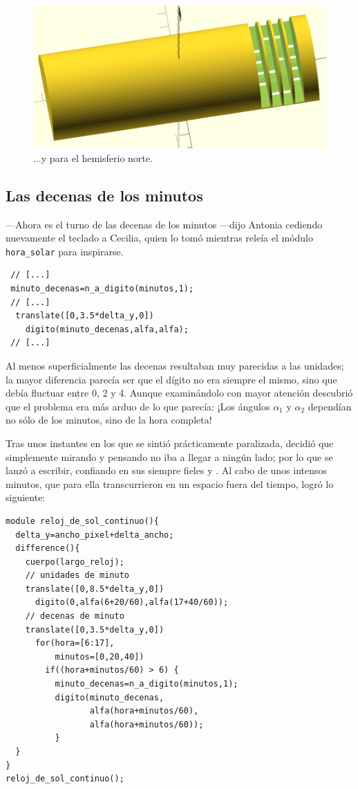 \begin{figure}[ht]
  \centering
  \includegraphics[width=.85\textwidth]{imagenes/unidades-minutos}  
  \caption{...y para el hemisferio norte.}
  \label{fig:unidades-norte}
\end{figure}

\subsection{Las decenas de los minutos}

---Ahora es el turno de las decenas de los minutos ---dijo Antonia
cediendo nuevamente el teclado a Cecilia, quien lo tomó mientras
releía el módulo \lstinline!hora_solar! para inspirarse.

\begin{lstlisting}
 // [...]
 minuto_decenas=n_a_digito(minutos,1);
 // [...]
  translate([0,3.5*delta_y,0])
    digito(minuto_decenas,alfa,alfa);
 // [...]
\end{lstlisting}

Al menos superficialmente las decenas resultaban muy parecidas a las
unidades; la mayor diferencia parecía ser que el dígito no era siempre
el mismo, sino que debía fluctuar entre 0, 2 y 4. Aunque examinándolo
con mayor atención descubrió que el problema era más arduo de lo que
parecía: ¡Los ángulos $\alpha_1$ y $\alpha_2$ dependían no sólo de los
minutos, sino de la hora completa!

Tras unos instantes en los que se sintió prácticamente paralizada,
decidió que simplemente mirando y pensando no iba a llegar a ningún
lado; por lo que se lanzó a escribir, confiando en sus siempre fieles
 y \keystroke{$\Longleftarrow$}. Al cabo de unos
intensos minutos, que para ella transcurrieron en un espacio fuera del
tiempo, logró lo siguiente:

\begin{lstlisting}
module reloj_de_sol_continuo(){
  delta_y=ancho_pixel+delta_ancho;
  difference(){
    cuerpo(largo_reloj);    
    // unidades de minuto
    translate([0,8.5*delta_y,0])
      digito(0,alfa(6+20/60),alfa(17+40/60));  
    // decenas de minuto
    translate([0,3.5*delta_y,0])
      for(hora=[6:17],
          minutos=[0,20,40])
        if((hora+minutos/60) > 6) {
          minuto_decenas=n_a_digito(minutos,1);
          digito(minuto_decenas,
                 alfa(hora+minutos/60),
                 alfa(hora+minutos/60));
          }
  }
}
reloj_de_sol_continuo();
\end{lstlisting}


